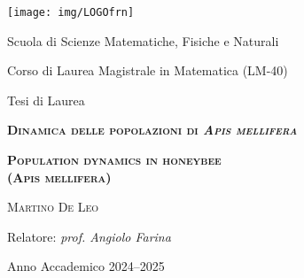 \thispagestyle{empty}
\begin{center}
\texttt{[image: img/LOGOfrn]}

\vspace{0.2em}
{ \large Scuola di Scienze Matematiche, Fisiche e Naturali }

\vspace{0.2em}
{ \large Corso di Laurea Magistrale in Matematica  (LM-40)}

\vspace{3em}
{\large Tesi di Laurea }

\vspace{4em}
{ \LARGE \scshape \bfseries Dinamica delle popolazioni di \emph{Apis mellifera} }

\vspace{2em}
{ \LARGE \scshape \bfseries Population dynamics in honeybee \\ (Apis mellifera) }

\vspace{2em}
{ \Large \scshape Martino De Leo}

\vspace{6em}
{ \Large Relatore: \textit{prof. Angiolo Farina} }

\vspace{4em}
Anno Accademico 2024--2025



\end{center}

\pagebreak
